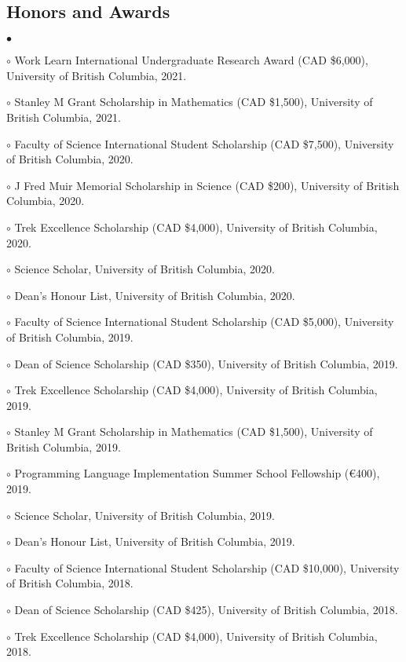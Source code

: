 \documentclass[margin,line]{res}
\newenvironment{list2}{
  \begin{list}{$\bullet$}{%
      \setlength{\itemsep}{0in}
      \setlength{\parsep}{0in} \setlength{\parskip}{0in}
      \setlength{\topsep}{0in} \setlength{\partopsep}{0in}
      \setlength{\leftmargin}{0.2in}}}{\end{list}}
\begin{document}
\begin{resume}
\section{\sc Honors and Awards}

\begin{list2}
\item[$\circ$] Work Learn International Undergraduate Research Award (CAD \$6,000), University of British Columbia, 2021.
\item[$\circ$] Stanley M Grant Scholarship in Mathematics (CAD \$1,500), University of British Columbia, 2021.
\item[$\circ$] Faculty of Science International Student Scholarship (CAD \$7,500), University of British Columbia, 2020.
\item[$\circ$] J Fred Muir Memorial Scholarship in Science (CAD \$200), University of British Columbia, 2020.
\item[$\circ$] Trek Excellence Scholarship (CAD \$4,000), University of British Columbia, 2020.
\item[$\circ$] Science Scholar, University of British Columbia, 2020.
\item[$\circ$] Dean's Honour List, University of British Columbia, 2020.
\item[$\circ$] Faculty of Science International Student Scholarship (CAD \$5,000), University of British Columbia, 2019.
\item[$\circ$] Dean of Science Scholarship (CAD \$350), University of British Columbia, 2019.
\item[$\circ$] Trek Excellence Scholarship (CAD \$4,000), University of British Columbia, 2019.
\item[$\circ$] Stanley M Grant Scholarship in Mathematics (CAD \$1,500), University of British Columbia, 2019.
\item[$\circ$] Programming Language Implementation Summer School Fellowship (€400), 2019.
\item[$\circ$] Science Scholar, University of British Columbia, 2019.
\item[$\circ$] Dean's Honour List, University of British Columbia, 2019.
\item[$\circ$] Faculty of Science International Student Scholarship (CAD \$10,000), University of British Columbia, 2018.
\item[$\circ$] Dean of Science Scholarship (CAD \$425), University of British Columbia, 2018.
\item[$\circ$] Trek Excellence Scholarship (CAD \$4,000), University of British Columbia, 2018.

\end{list2}
\end{resume}
\end{document}

